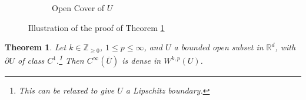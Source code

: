 \documentclass[letterpaper,10pt]{article}
\theoremstyle{definition}
\theoremstyle{remark}
\theoremstyle{plain}
\newtheorem{thm}{Theorem}[section]
\begin{document}
\begin{figure}
\begin{subfigure}{0.4\textwidth}
            \caption{Open Cover of $U$}
            \label{fig:density3opencover}
        \end{subfigure}
        \caption{Illustration of the proof of Theorem \ref{thm:density3}}
        \label{fig:density3}
    \end{figure}
\begin{thm}\label{thm:density3}
    Let $k\in\mathbb Z_{\geq 0}$, $1\leq p\leq\infty$, and $U$ a bounded
    open subset in $\mathbb R^d$, with $\partial U$ of class $C^1$.\footnote{This can 
    be relaxed to give $U$ a Lipschitz boundary.} %
    Then $C^\infty(\overline U)$ is dense in $W^{k,p}(U)$.
\end{thm}
\end{document}
